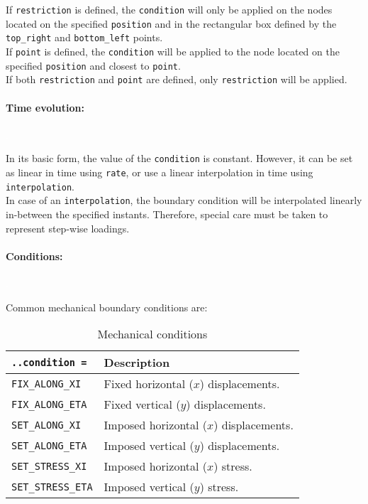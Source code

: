 \documentclass[10pt]{article}
\newcommand{\whiteline}{\textcolor{white}{.\\}}
\begin{document}
If \verb+restriction+ is defined, the \verb+condition+ will only be applied on the nodes located on the specified \verb+position+ and in the rectangular box defined by the \verb+top_right+ and \verb+bottom_left+ points.\\

If \verb+point+ is defined, the \verb+condition+ will be applied to the node located on the specified \verb+position+ and closest to \verb+point+.\\

If both \verb+restriction+ and \verb+point+ are defined, only \verb+restriction+ will be applied.

\paragraph{Time evolution:} \whiteline

In its basic form, the value of the \verb+condition+ is constant. However, it can be set as linear in time using \verb+rate+, or use a linear interpolation in time using \verb+interpolation+.\\

In case of an \verb+interpolation+, the boundary condition will be interpolated linearly in-between the specified instants. Therefore, special care must be taken to represent step-wise loadings.

\eject

\paragraph{Conditions:} \whiteline

Common mechanical boundary conditions are:

\begin{table}[h!]
\begin{tabularx}{\textwidth}{lX}
\verb+..condition =+ & Description\\
\hline
\verb+FIX_ALONG_XI+ & Fixed horizontal ($x$) displacements.\\
\verb+FIX_ALONG_ETA+ & Fixed vertical ($y$) displacements.\\
\verb+SET_ALONG_XI+ & Imposed horizontal ($x$) displacements.\\
\verb+SET_ALONG_ETA+ & Imposed vertical ($y$) displacements.\\
\verb+SET_STRESS_XI+ & Imposed horizontal ($x$) stress.\\
\verb+SET_STRESS_ETA+ & Imposed vertical ($y$) stress.\\
\hline
\end{tabularx}
\caption{Mechanical conditions}
\end{table}
\end{document}
